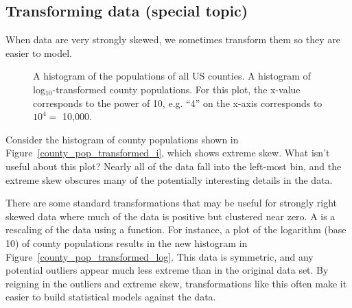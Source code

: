 

\D{\newpage}

\subsection{Transforming data (special topic)}
\label{transformingDataSubsection}

\noindent%
When data are very strongly skewed, we sometimes transform
them so they are easier to model.

\begin{figure}[ht]
  \centering
  \caption{ A histogram of
      the populations of all US counties.
       A histogram of
      log$_{10}$-transformed county populations.
      For this plot, the x-value corresponds to the power
      of 10, e.g. ``4'' on the x-axis corresponds to
      $10^4 =$ 10,000.}
    \label{county_pop_transformed}
\end{figure}

\begin{examplewrap}
\begin{nexample}{Consider the histogram of county populations
    shown in Figure~\ref{county_pop_transformed_i},
    which shows extreme skew.
    What isn't useful about this plot?}
  Nearly all of the data fall into the left-most bin,
  and the extreme skew obscures many of the potentially
  interesting details in the data.
\end{nexample}
\end{examplewrap}

There are some standard transformations that may be
useful for strongly right skewed data where much of the
data is positive but clustered near zero.
A  is a rescaling of the data
using a function.
For instance, a plot of the logarithm (base 10) of
county populations results in the new histogram in
Figure~\ref{county_pop_transformed_log}.
This data is symmetric, and any potential outliers
appear much less extreme than in the original data set.
By reigning in the outliers and extreme skew,
transformations like this often make it easier to build
statistical models against the data.

